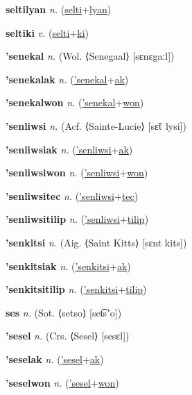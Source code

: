 \textbf{\hypertarget{seltilyan}{seltilyan}} \textit{n.} (\hyperlink{selti}{selti}+\allowbreak \hyperlink{lyan}{lyan})


\textbf{\hypertarget{seltiki}{seltiki}} \textit{v.} (\hyperlink{selti}{selti}+\allowbreak \hyperlink{ki}{ki})


\textbf{\hypertarget{'senekal}{'senekal}} \textit{n.} (Wol. ⟨Senegaal⟩ [sɛnɛgaːl])


\textbf{\hypertarget{'senekalak}{'senekalak}} \textit{n.} (\hyperlink{'senekal}{'senekal}+\allowbreak \hyperlink{ak}{ak})


\textbf{\hypertarget{'senekalwon}{'senekalwon}} \textit{n.} (\hyperlink{'senekal}{'senekal}+\allowbreak \hyperlink{won}{won})


\textbf{\hypertarget{'senliwsi}{'senliwsi}} \textit{n.} (Acf. ⟨Sainte-Lucie⟩ [sɛ̃t lysi])


\textbf{\hypertarget{'senliwsiak}{'senliwsiak}} \textit{n.} (\hyperlink{'senliwsi}{'senliwsi}+\allowbreak \hyperlink{ak}{ak})


\textbf{\hypertarget{'senliwsiwon}{'senliwsiwon}} \textit{n.} (\hyperlink{'senliwsi}{'senliwsi}+\allowbreak \hyperlink{won}{won})


\textbf{\hypertarget{'senliwsitec}{'senliwsitec}} \textit{n.} (\hyperlink{'senliwsi}{'senliwsi}+\allowbreak \hyperlink{tec}{tec})


\textbf{\hypertarget{'senliwsitilip}{'senliwsitilip}} \textit{n.} (\hyperlink{'senliwsi}{'senliwsi}+\allowbreak \hyperlink{tilip}{tilip})


\textbf{\hypertarget{'senkitsi}{'senkitsi}} \textit{n.} (Aig. ⟨Saint Kitts⟩ [sɛnt kits])


\textbf{\hypertarget{'senkitsiak}{'senkitsiak}} \textit{n.} (\hyperlink{'senkitsi}{'senkitsi}+\allowbreak \hyperlink{ak}{ak})


\textbf{\hypertarget{'senkitsitilip}{'senkitsitilip}} \textit{n.} (\hyperlink{'senkitsi}{'senkitsi}+\allowbreak \hyperlink{tilip}{tilip})


\textbf{\hypertarget{ses}{ses}} \textit{n.} (Sot. ⟨setso⟩ [set͡sʼo])


\textbf{\hypertarget{'sesel}{'sesel}} \textit{n.} (Crs. ⟨Sesel⟩ [sesɛl])


\textbf{\hypertarget{'seselak}{'seselak}} \textit{n.} (\hyperlink{'sesel}{'sesel}+\allowbreak \hyperlink{ak}{ak})


\textbf{\hypertarget{'seselwon}{'seselwon}} \textit{n.} (\hyperlink{'sesel}{'sesel}+\allowbreak \hyperlink{won}{won})


